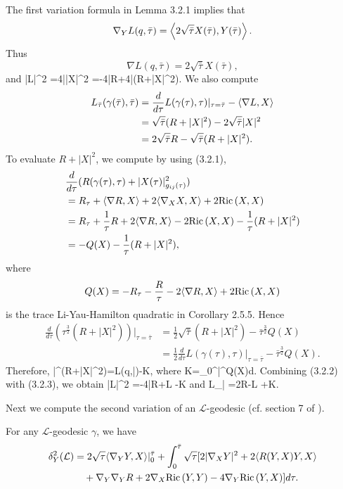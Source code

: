 The first variation formula in Lemma 3.2.1 implies that
$$
\nabla_YL(q,\bar{\tau}) =\left\langle2\sqrt{\bar{\tau}}X(\bar{\tau}),
Y(\bar{\tau})\right\rangle.
$$
Thus
$$
\nabla L(q,\bar{\tau}) =2\sqrt{\bar{\tau}}X(\bar{\tau}),
$$
and \be |\nabla L|^2 =4\bar{\tau}|X|^2
=-4\bar{\tau}R+4\bar{\tau}(R+|X|^2).%
\ee We also compute
\begin{align}
L_{\bar{\tau}}(\gamma(\bar{\tau}),\bar{\tau})& =
\frac{d}{d\tau}L(\gamma(\tau),\tau)|_{\tau=\bar{\tau}}
-\langle\nabla L,X\rangle\\
&  = \sqrt{\bar{\tau}}(R+|X|^2)-2\sqrt{\bar{\tau}}|X|^2 \nonumber\\
&  = 2\sqrt{\bar{\tau}}R-\sqrt{\bar{\tau}}(R+|X|^2).\nonumber
\end{align}
To evaluate $R+|X|^2$, we compute by using (3.2.1),
\begin{align*}
& \frac{d}{d\tau}(R(\gamma(\tau),\tau)+|X(\tau)|^2_{g_{ij}(\tau)})\\
& = R_\tau+\langle\nabla R,X\rangle+2\langle\nabla_XX,X\rangle+2{ {\rm Ric}\,}(X,X)\\
& = R_\tau+\frac{1}{\tau}R+2\langle\nabla R,X\rangle-2 {{\rm Ric}\,}(X,X)
-\frac{1}{\tau}(R+|X|^2)\\
&  = -Q(X)-\frac{1}{\tau}(R+|X|^2),
\end{align*}
where
$$
Q(X)=-R_\tau-\frac{R}{\tau}-2\langle\nabla R,X\rangle+2{ {\rm Ric}\,}(X,X)
$$
is the trace Li-Yau-Hamilton quadratic in Corollary 2.5.5. Hence
\begin{align*}
\frac{d}{d\tau}(\tau^\frac{3}{2}(R+|X|^2))|_{\tau=\bar{\tau}} &
=\frac{1}{2}\sqrt{\bar{\tau}}(R+|X|^2)
-\bar{\tau}^\frac{3}{2}Q(X)\\
&
=\frac{1}{2}\frac{d}{d\tau}L(\gamma(\tau),\tau)|_{\tau=\bar{\tau}}
-\bar{\tau}^\frac{3}{2}Q(X).
\end{align*}
Therefore, \be
\bar{\tau}^(R+|X|^2)=L(q,\bar{\tau})-K,
\ee where \be K=\int_0^{\bar{\tau}}\tau^Q(X)d\tau.
\ee Combining (3.2.2) with (3.2.3), we obtain \be |\nabla L|^2
=-4\bar{\tau}R+L
-K  %
\ee and \be L_{\bar{\tau}}
=2\sqrt{\bar{\tau}}R-L
+K.  %
\ee

Next we compute the second variation of an $\mathcal{L}$-geodesic
(cf. section 7 of \cite{P1}).

\begin{lemma}
  \label{lem:cz-second-variation-of-l-length}
For any $\mathcal{L}$-geodesic $\gamma$, we have
\begin{align*}
\delta_Y^2(\mathcal{L}) &
=2\sqrt{\tau}\langle\nabla_YY,X\rangle|_0^{\bar{\tau}}
+\int_0^{\bar{\tau}}\sqrt{\tau}[2|\nabla_XY|^2
+2\langle R(Y,X)Y,X\rangle\\
&\quad +\nabla_Y\nabla_YR+2\nabla_X{{\rm Ric}\,}(Y,Y)-4\nabla_Y
{\rm Ric}\,(Y,X)]d\tau.
\end{align*}
\end{lemma}

